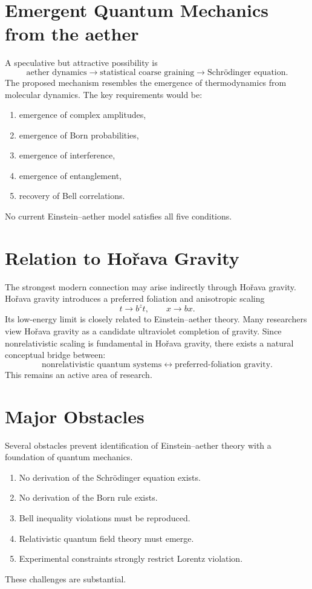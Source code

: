 \documentclass[11pt]{article}
\begin{document}
\section{Emergent Quantum Mechanics from the aether}
A speculative but attractive possibility is
\begin{equation}
\text{aether dynamics}
\longrightarrow
\text{statistical coarse graining}
\longrightarrow
\text{Schr\"odinger equation}.
\end{equation}
The proposed mechanism resembles the emergence of thermodynamics from
molecular dynamics.
The key requirements would be:
\begin{enumerate}
\item emergence of complex amplitudes,
\item emergence of Born probabilities,
\item emergence of interference,
\item emergence of entanglement,
\item recovery of Bell correlations.
\end{enumerate}
No current Einstein--aether model satisfies all five conditions.
\section{Relation to Ho\v rava Gravity}
The strongest modern connection may arise indirectly through
Ho\v rava gravity.
Ho\v rava gravity introduces a preferred foliation and anisotropic
scaling
\begin{equation}
t\rightarrow b^z t,
\qquad
x\rightarrow bx.
\end{equation}
Its low-energy limit is closely related to Einstein--aether theory.
Many researchers view Ho\v rava gravity as a candidate ultraviolet
completion of gravity.
Since nonrelativistic scaling is fundamental in Ho\v rava gravity,
there exists a natural conceptual bridge between:
\begin{equation}
\text{nonrelativistic quantum systems}
\leftrightarrow
\text{preferred-foliation gravity}.
\end{equation}
This remains an active area of research.
\section{Major Obstacles}
Several obstacles prevent identification of Einstein--aether theory
with a foundation of quantum mechanics.
\begin{enumerate}
\item No derivation of the Schr\"odinger equation exists.
\item No derivation of the Born rule exists.
\item Bell inequality violations must be reproduced.
\item Relativistic quantum field theory must emerge.
\item Experimental constraints strongly restrict Lorentz violation.
\end{enumerate}
These challenges are substantial.
\end{document}
